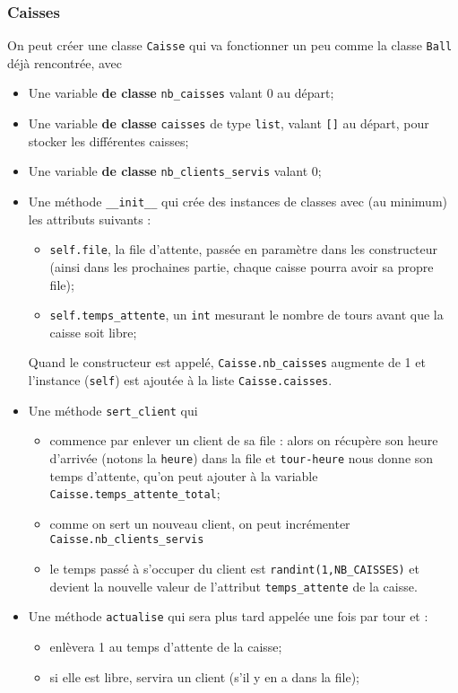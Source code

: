 \documentclass[10pt,firamath,cours]{nsi}
\begin{document}
\begin{exercice}
\subsubsection*{Caisses}
On peut créer une classe \texttt{Caisse} qui va fonctionner un peu comme la classe \texttt{Ball} déjà rencontrée, avec
\begin{itemize}
	\item Une variable \textbf{de classe} \texttt{nb\_caisses} valant 0 au départ;
    \item Une variable \textbf{de classe} \texttt{caisses} de type \texttt{list}, valant \texttt{[]} au départ, pour stocker les différentes caisses;
    \item Une variable \textbf{de classe} \texttt{nb\_clients\_servis} valant 0;
    \item Une méthode \texttt{__init__} qui crée des instances de classes avec (au minimum) les attributs suivants :
    \begin{itemize}
    	\item \texttt{self.file}, la file d'attente, passée en paramètre dans les constructeur (ainsi dans les prochaines partie, chaque caisse pourra avoir sa propre file);
        \item \texttt{self.temps_attente}, un \texttt{int} mesurant le nombre de tours avant que la caisse soit libre;
    \end{itemize}
    Quand le constructeur est appelé, \texttt{Caisse.nb_caisses} augmente de 1 et l'instance (\texttt{self}) est ajoutée à la liste \texttt{Caisse.caisses}.
    \item Une méthode \texttt{sert_client} qui
    \begin{itemize}
    	\item commence par enlever un client de sa file : alors on récupère son heure d'arrivée (notons la \texttt{heure}) dans la file et \texttt{tour-heure} nous donne son temps d'attente, qu'on peut ajouter à la variable \texttt{Caisse.temps_attente_total};
        \item  comme on sert un nouveau client, on peut incrémenter \texttt{Caisse.nb_clients_servis}
        \item  le temps passé à s'occuper du client est \texttt{randint(1,NB_CAISSES)} et devient la nouvelle valeur de l'attribut \texttt{temps_attente} de la caisse.
    \end{itemize}
    \item Une méthode \texttt{actualise} qui sera plus tard appelée une fois par tour et :
        \begin{itemize}
        	\item enlèvera 1 au temps d'attente de la caisse;
            \item si elle est libre, servira un client (s'il y en a dans la file);
        \end{itemize}

\end{itemize}
\end{exercice}
\end{document}
